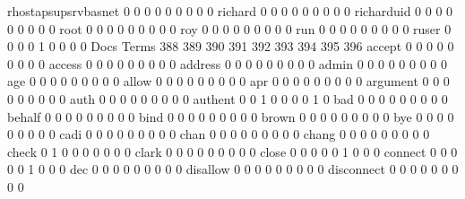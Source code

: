 \documentclass[compress,8pt]{beamer}
\begin{document}
\begin{frame}
\begin{Schunk}
  rhostapsupsrvbasnet                        0   0   0   0   0   0   0   0   0
  richard                                    0   0   0   0   0   0   0   0   0
  richarduid                                 0   0   0   0   0   0   0   0   0
  root                                       0   0   0   0   0   0   0   0   0
  roy                                        0   0   0   0   0   0   0   0   0
  run                                        0   0   0   0   0   0   0   0   0
  ruser                                      0   0   0   0   1   0   0   0   0
                                          Docs
Terms                                      388 389 390 391 392 393 394 395 396
  accept                                     0   0   0   0   0   0   0   0   0
  access                                     0   0   0   0   0   0   0   0   0
  address                                    0   0   0   0   0   0   0   0   0
  admin                                      0   0   0   0   0   0   0   0   0
  age                                        0   0   0   0   0   0   0   0   0
  allow                                      0   0   0   0   0   0   0   0   0
  apr                                        0   0   0   0   0   0   0   0   0
  argument                                   0   0   0   0   0   0   0   0   0
  auth                                       0   0   0   0   0   0   0   0   0
  authent                                    0   0   1   0   0   0   0   1   0
  bad                                        0   0   0   0   0   0   0   0   0
  behalf                                     0   0   0   0   0   0   0   0   0
  bind                                       0   0   0   0   0   0   0   0   0
  brown                                      0   0   0   0   0   0   0   0   0
  bye                                        0   0   0   0   0   0   0   0   0
  cadi                                       0   0   0   0   0   0   0   0   0
  chan                                       0   0   0   0   0   0   0   0   0
  chang                                      0   0   0   0   0   0   0   0   0
  check                                      0   1   0   0   0   0   0   0   0
  clark                                      0   0   0   0   0   0   0   0   0
  close                                      0   0   0   0   0   1   0   0   0
  connect                                    0   0   0   0   0   1   0   0   0
  dec                                        0   0   0   0   0   0   0   0   0
  disallow                                   0   0   0   0   0   0   0   0   0
  disconnect                                 0   0   0   0   0   0   0   0   0

\end{Schunk}
\end{frame}
\end{document}
